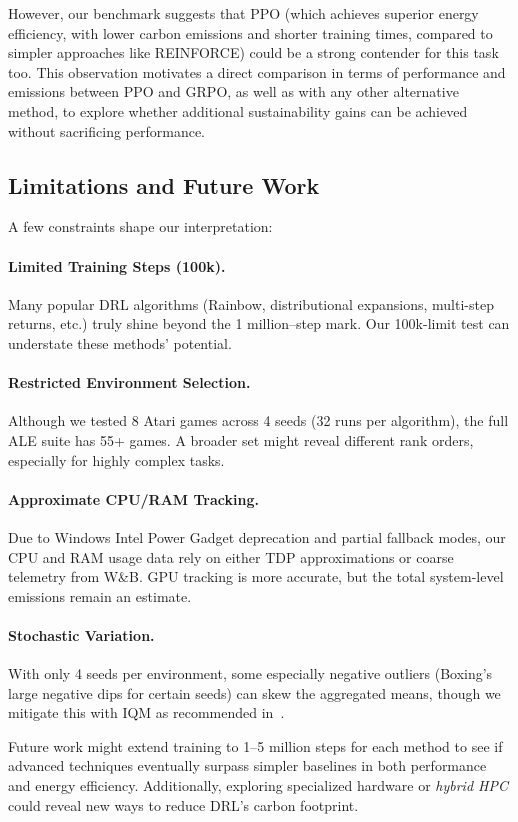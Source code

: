 However, our benchmark suggests that PPO (which achieves superior energy efficiency, with lower carbon emissions and shorter training times, compared to simpler approaches like REINFORCE) could be a strong contender for this task too. This observation motivates a direct comparison in terms of performance and emissions between PPO and GRPO, as well as with any other alternative method, to explore whether additional sustainability gains can be achieved without sacrificing performance.

\subsection{Limitations and Future Work}
\label{subsec:limitations_futurework}

A few constraints shape our interpretation:

\paragraph{Limited Training Steps (100k).}
Many popular DRL algorithms (Rainbow, distributional expansions, multi-step returns, etc.) 
truly shine beyond the 1 million–step mark. Our 100k-limit test can understate 
these methods’ potential.

\paragraph{Restricted Environment Selection.}
Although we tested 8 Atari games across 4 seeds (32 runs per algorithm), 
the full ALE suite has 55+ games. A broader set might reveal 
different rank orders, especially for highly complex tasks.

\paragraph{Approximate CPU/RAM Tracking.}
Due to Windows Intel Power Gadget deprecation and partial fallback modes, 
our CPU and RAM usage data rely on either TDP approximations or 
coarse telemetry from W\&B. GPU tracking is more accurate, 
but the total system-level emissions remain an estimate.

\paragraph{Stochastic Variation.}
With only 4 seeds per environment, 
some especially negative outliers (Boxing’s large negative dips for certain seeds) 
can skew the aggregated means, 
though we mitigate this with IQM as recommended in~\cite{agarwal:statistical_precipice}.

Future work might extend training to 1--5 million steps for each method 
to see if advanced techniques eventually surpass simpler baselines 
in both performance and energy efficiency. 
Additionally, exploring specialized hardware or \emph{hybrid HPC} 
could reveal new ways to reduce DRL’s carbon footprint.
